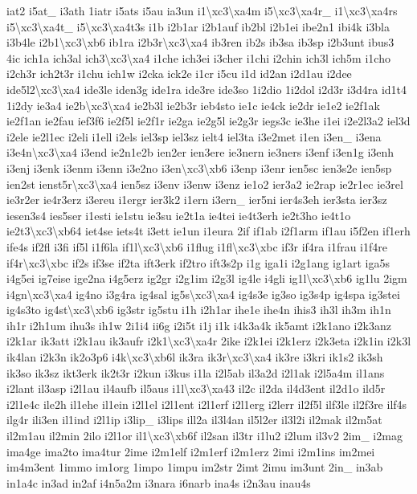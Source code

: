 \begin{DoxyCompactItemize}
iat2 i5at\-\_\- i3ath 1iatr i5ats i5au ia3un i1\textbackslash{}xc3\textbackslash{}xa4m i5\textbackslash{}xc3\textbackslash{}xa4r\-\_\- i1\textbackslash{}xc3\textbackslash{}xa4rs i5\textbackslash{}xc3\textbackslash{}xa4t\-\_\- i5\textbackslash{}xc3\textbackslash{}xa4t3s i1b i2b1ar i2b1auf ib2bl i2b1ei ibe2n1 ibi4k i3bla i3b4le i2b1\textbackslash{}xc3\textbackslash{}xb6 ib1ra i2b3r\textbackslash{}xc3\textbackslash{}xa4 ib3ren ib2s ib3sa ib3sp i2b3unt ibus3 4ic ich1a ich3al ich3\textbackslash{}xc3\textbackslash{}xa4 i1che ich3ei i3cher i1chi i2chin ich3l ich5m i1cho i2ch3r ich2t3r i1chu ich1w i2cka ick2e i1cr i5cu i1d id2an i2d1au i2dee ide5l2\textbackslash{}xc3\textbackslash{}xa4 ide3le iden3g ide1ra ide3re ide3so 1i2dio 1i2dol i2d3r i3d4ra id1t4 1i2dy ie3a4 ie2b\textbackslash{}xc3\textbackslash{}xa4 ie2b3l ie2b3r ieb4sto ie1c ie4ck ie2dr ie1e2 ie2f1ak ie2f1an ie2fau ief3f6 ie2f5l ie2f1r ie2ga ie2g5l ie2g3r iegs3c ie3he i1ei i2e2l3a2 iel3d i2ele ie2l1ec i2eli i1ell i2els iel3sp iel3sz ielt4 iel3ta i3e2met i1en i3en\-\_\- i3ena i3e4n\textbackslash{}xc3\textbackslash{}xa4 i3end ie2n1e2b ien2er ien3ere ie3nern ie3ners i3enf i3en1g i3enh i3enj i3enk i3enm i3enn i3e2no i3en\textbackslash{}xc3\textbackslash{}xb6 i3enp i3enr ien5sc ien3s2e ien5sp ien2st ienst5r\textbackslash{}xc3\textbackslash{}xa4 ien5sz i3env i3enw i3enz ie1o2 ier3a2 ie2rap ie2r1ec ie3rel ie3r2er ie4r3erz i3ereu i1ergr ier3k2 i1ern i3ern\-\_\- ier5ni ier4s3eh ier3sta ier3sz iesen3s4 ies5ser i1esti ie1stu ie3su ie2t1a ie4tei ie4t3erh ie2t3ho ie4t1o ie2t3\textbackslash{}xc3\textbackslash{}xb64 iet4se iets4t i3ett ie1un i1eura 2if if1ab i2f1arm if1au i5f2en if1erh ife4s if2fl i3fi if5l i1f6la if1l\textbackslash{}xc3\textbackslash{}xb6 i1flug i1fl\textbackslash{}xc3\textbackslash{}xbc if3r if4ra i1frau i1f4re if4r\textbackslash{}xc3\textbackslash{}xbc if2s if3se if2ta ift3erk if2tro ift3s2p i1g iga1i i2g1ang ig1art iga5s i4g5ei ig7eise ige2na i4g5erz ig2gr i2g1im i2g3l ig4le i4gli ig1l\textbackslash{}xc3\textbackslash{}xb6 ig1lu 2igm i4gn\textbackslash{}xc3\textbackslash{}xa4 ig4no i3g4ra ig4sal ig5s\textbackslash{}xc3\textbackslash{}xa4 ig4s3e ig3so ig3s4p ig4spa ig3stei ig4s3to ig4st\textbackslash{}xc3\textbackslash{}xb6 ig3str ig5stu i1h i2h1ar ihe1e ihe4n ihis3 ih3l ih3m ih1n ih1r i2h1um ihu3s ih1w 2i1i4 ii6g i2i5t i1j i1k i4k3a4k ik5amt i2k1ano i2k3anz i2k1ar ik3att i2k1au ik3aufr i2k1\textbackslash{}xc3\textbackslash{}xa4r 2ike i2k1ei i2k1erz i2k3eta i2k1in i2k3l ik4lan i2k3n ik2o3p6 i4k\textbackslash{}xc3\textbackslash{}xb6l ik3ra ik3r\textbackslash{}xc3\textbackslash{}xa4 ik3re i3kri ik1s2 ik3sh ik3so ik3sz ikt3erk ik2t3r i2kun i3kus i1la i2l5ab il3a2d i2l1ak i2l5a4m il1ans i2lant il3asp i2l1au il4aufb il5aus i1l\textbackslash{}xc3\textbackslash{}xa43 il2c il2da il4d3ent il2d1o ild5r i2l1e4c ile2h il1ehe il1ein i2l1el i2l1ent i2l1erf i2l1erg i2lerr il2f5l ilf3le il2f3re ilf4s ilg4r ili3en il1ind i2l1ip i3lip\-\_\- i3lips ill2a il3l4an il5l2er il3l2i il2mak il2m5at il2m1au il2min 2ilo i2l1or il1\textbackslash{}xc3\textbackslash{}xb6f il2san il3tr i1lu2 i2lum il3v2 2im\-\_\- i2mag ima4ge ima2to ima4tur 2ime i2m1elf i2m1erf i2m1erz 2imi i2m1ins im2mei im4m3ent 1immo im1org 1impo 1impu im2str 2imt 2imu im3unt 2in\-\_\- in3ab in1a4c in3ad in2af i4n5a2m i3nara i6narb ina4s i2n3au inau4s 
\end{DoxyCompactItemize}
